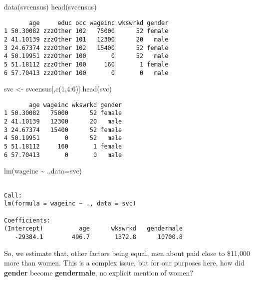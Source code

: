 \documentclass[
  letterpaper,
  DIV=11,
  numbers=noendperiod,
  oneside]{scrreprt}
\newenvironment{Shaded}{\begin{snugshade}}{\end{snugshade}}
\newcommand{\AttributeTok}[1]{\textcolor[rgb]{0.40,0.45,0.13}{#1}}
\newcommand{\DecValTok}[1]{\textcolor[rgb]{0.68,0.00,0.00}{#1}}
\newcommand{\FunctionTok}[1]{\textcolor[rgb]{0.28,0.35,0.67}{#1}}
\newcommand{\NormalTok}[1]{\textcolor[rgb]{0.00,0.23,0.31}{#1}}
\newcommand{\OtherTok}[1]{\textcolor[rgb]{0.00,0.23,0.31}{#1}}
\newcommand{\SpecialCharTok}[1]{\textcolor[rgb]{0.37,0.37,0.37}{#1}}
\begin{document}
\begin{Shaded}
\begin{Highlighting}[]
\FunctionTok{data}\NormalTok{(svcensus) }
\FunctionTok{head}\NormalTok{(svcensus) }
\end{Highlighting}
\end{Shaded}

\begin{verbatim}
       age     educ occ wageinc wkswrkd gender
1 50.30082 zzzOther 102   75000      52 female
2 41.10139 zzzOther 101   12300      20   male
3 24.67374 zzzOther 102   15400      52 female
4 50.19951 zzzOther 100       0      52   male
5 51.18112 zzzOther 100     160       1 female
6 57.70413 zzzOther 100       0       0   male
\end{verbatim}

\begin{Shaded}
\begin{Highlighting}[]
\NormalTok{svc }\OtherTok{\textless{}{-}}\NormalTok{ svcensus[,}\FunctionTok{c}\NormalTok{(}\DecValTok{1}\NormalTok{,}\DecValTok{4}\SpecialCharTok{:}\DecValTok{6}\NormalTok{)] }
\FunctionTok{head}\NormalTok{(svc) }
\end{Highlighting}
\end{Shaded}

\begin{verbatim}
       age wageinc wkswrkd gender
1 50.30082   75000      52 female
2 41.10139   12300      20   male
3 24.67374   15400      52 female
4 50.19951       0      52   male
5 51.18112     160       1 female
6 57.70413       0       0   male
\end{verbatim}

\begin{Shaded}
\begin{Highlighting}[]
\FunctionTok{lm}\NormalTok{(wageinc }\SpecialCharTok{\textasciitilde{}}\NormalTok{ .,}\AttributeTok{data=}\NormalTok{svc) }
\end{Highlighting}
\end{Shaded}

\begin{verbatim}

Call:
lm(formula = wageinc ~ ., data = svc)

Coefficients:
(Intercept)          age      wkswrkd   gendermale  
   -29384.1        496.7       1372.8      10700.8  
\end{verbatim}

So, we estimate that, other factors being equal, men about paid close to
\$11,000 more than women. This is a complex issue, but for our purposes
here, how did \textbf{gender} become \textbf{gendermale}, no explicit
mention of women?
\end{document}
